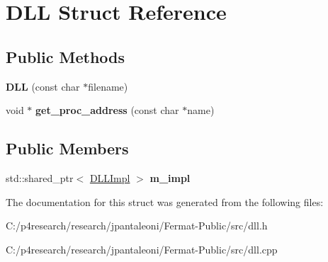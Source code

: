 \hypertarget{struct_d_l_l}{}\section{D\+LL Struct Reference}
\label{struct_d_l_l}
\subsection*{Public Methods}
\begin{DoxyCompactItemize}
\item 
\mbox{\label{struct_d_l_l_aecd2352677877712d7195b5a7f0d7448}} 
{\bfseries D\+LL} (const char $\ast$filename)
\item 
\mbox{\label{struct_d_l_l_a0cf3cdb24d99798189ea0588e98d35b9}} 
void $\ast$ {\bfseries get\+\_\+proc\+\_\+address} (const char $\ast$name)
\end{DoxyCompactItemize}
\subsection*{Public Members}
\begin{DoxyCompactItemize}
\item 
\mbox{\label{struct_d_l_l_a840c4d872e0164525f5582e1d78b8d5c}} 
std\+::shared\+\_\+ptr$<$ \hyperlink{struct_d_l_l_impl}{D\+L\+L\+Impl} $>$ {\bfseries m\+\_\+impl}
\end{DoxyCompactItemize}


The documentation for this struct was generated from the following files\+:\begin{DoxyCompactItemize}
\item 
C\+:/p4research/research/jpantaleoni/\+Fermat-\/\+Public/src/dll.\+h\item 
C\+:/p4research/research/jpantaleoni/\+Fermat-\/\+Public/src/dll.\+cpp\end{DoxyCompactItemize}
